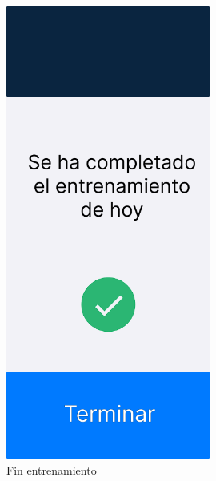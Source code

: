 \begin{figure}[H]
   \centering
    \includegraphics[width=0.6\textwidth]{fotos/Frame 20.png}
    \caption{Fin entrenamiento}
    \label{fig:Fin entrenamiento}
\end{figure}
